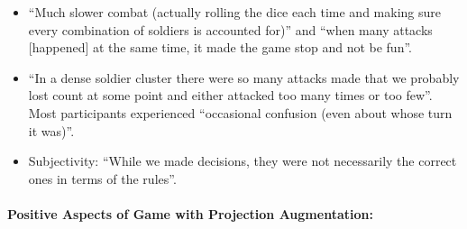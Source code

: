 \documentclass[review]{vgtc}                 %
\begin{document}
\begin{itemize}

\vspace{-0.05in}

\item 
``Much slower combat (actually rolling the dice each time and making sure every combination of soldiers is accounted for)''
and
``when many attacks [happened] at the same time, it made the game stop and not be fun''.
\vspace{\mysep}

\item 
``In a dense soldier cluster there were so many attacks made that we probably lost count at some point and either attacked too many times or too few''.
Most participants experienced ``occasional confusion (even about whose turn it was)''.%
\vspace{\mysep}

\item 
Subjectivity: ``While we made decisions, they were not necessarily the
correct ones in terms of the rules''.

\end{itemize}

\paragraph{Positive Aspects of Game with Projection Augmentation:}
\end{document}

